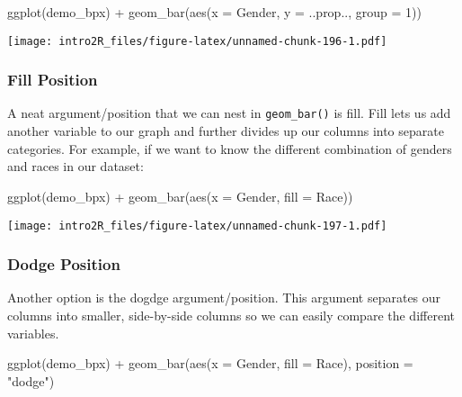 \documentclass[
]{book}
\newenvironment{Shaded}{\begin{snugshade}}{\end{snugshade}}
\newcommand{\AttributeTok}[1]{\textcolor[rgb]{0.77,0.63,0.00}{#1}}
\newcommand{\DecValTok}[1]{\textcolor[rgb]{0.00,0.00,0.81}{#1}}
\newcommand{\FunctionTok}[1]{\textcolor[rgb]{0.00,0.00,0.00}{#1}}
\newcommand{\NormalTok}[1]{#1}
\newcommand{\SpecialCharTok}[1]{\textcolor[rgb]{0.00,0.00,0.00}{#1}}
\newcommand{\StringTok}[1]{\textcolor[rgb]{0.31,0.60,0.02}{#1}}
\begin{document}
\begin{Shaded}
\begin{Highlighting}[]
\FunctionTok{ggplot}\NormalTok{(demo\_bpx) }\SpecialCharTok{+}
    \FunctionTok{geom\_bar}\NormalTok{(}\FunctionTok{aes}\NormalTok{(}\AttributeTok{x =}\NormalTok{ Gender, }\AttributeTok{y =}\NormalTok{ ..prop.., }\AttributeTok{group =} \DecValTok{1}\NormalTok{))}
\end{Highlighting}
\end{Shaded}

\texttt{[image: intro2R\_files/figure-latex/unnamed-chunk-196-1.pdf]}

\hypertarget{fill-position}{%
\subsubsection{Fill Position}\label{fill-position}}

A neat argument/position that we can nest in \texttt{geom\_bar()} is fill. Fill lets us add another variable to our graph and further divides up our columns into separate categories. For example, if we want to know the different combination of genders and races in our dataset:

\begin{Shaded}
\begin{Highlighting}[]
\FunctionTok{ggplot}\NormalTok{(demo\_bpx) }\SpecialCharTok{+}
    \FunctionTok{geom\_bar}\NormalTok{(}\FunctionTok{aes}\NormalTok{(}\AttributeTok{x =}\NormalTok{ Gender, }\AttributeTok{fill =}\NormalTok{ Race))}
\end{Highlighting}
\end{Shaded}

\texttt{[image: intro2R\_files/figure-latex/unnamed-chunk-197-1.pdf]}

\hypertarget{dodge-position}{%
\subsubsection{Dodge Position}\label{dodge-position}}

Another option is the dogdge argument/position. This argument separates our columns into smaller, side-by-side columns so we can easily compare the different variables.

\begin{Shaded}
\begin{Highlighting}[]
\FunctionTok{ggplot}\NormalTok{(demo\_bpx) }\SpecialCharTok{+}
  \FunctionTok{geom\_bar}\NormalTok{(}\FunctionTok{aes}\NormalTok{(}\AttributeTok{x =}\NormalTok{ Gender, }\AttributeTok{fill =}\NormalTok{ Race), }
           \AttributeTok{position =} \StringTok{"dodge"}\NormalTok{)}
\end{Highlighting}
\end{Shaded}
\end{document}
